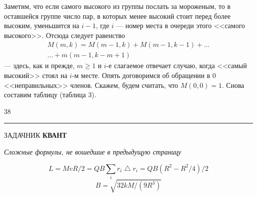 \begin{multicols}{2}
	Заметим, что если самого высокого из группы послать за мороженым, то в оставшейся группе число пар, в которых менее высокий стоит перед более высоким, уменьшится на $i-1$, где $i$ --- номер места в очереди этого <<самого высокого>>. Отсюда следует равенство
	\begin{gather*}
		M(m,k)=M(m-1,k)+M(m-1,k-1)+\ldots \\
 \ldots+m(m-1,k-m+1)   
	\end{gather*}
	--- здесь, как и прежде, $m\geqslant1$ и $i$-е слагаемое отвечает случаю, когда <<самый высокий>> стоял на $i$-м месте. Опять договоримся об обращении в 0 <<неправильных>> членов. Скажем, будем считать, что $M(0,0)=1$. Снова составим таблицу (таблица 3).
	
\end{multicols}	

\begin{center}
	\Large{38}
\end{center}

\vspace{-8mm}
\noindent\rule{\textwidth}{0,5pt}
\begin{center}
	\vspace{-3mm}
	\tiny{ЗАДАЧНИК \textbf{КВАНТ}}
\end{center}

\begin{center}
	{\large \textit{Сложные формулы, не вошедшие в предыдущую страницу}}
	
	\[
	L=MvR/2=QB\sum_{i} r_{i} \bigtriangleup r_{i} = QB(R^{2}-R^{2}/4)/2
	\]
	\vspace{-6mm}
	\[
	B=\sqrt{32kM/(9R^{3})}
	\]
\end{center}

\newpage